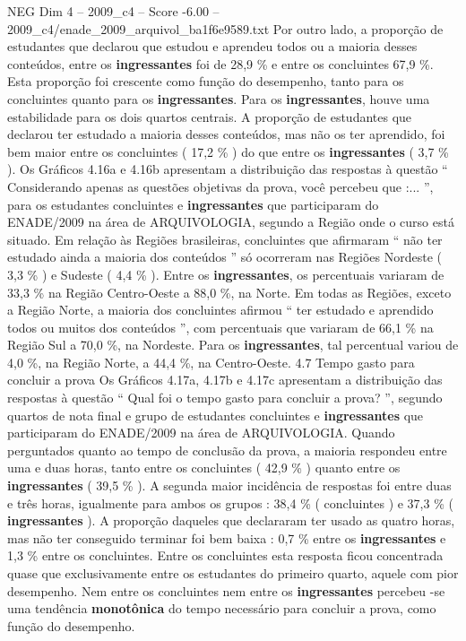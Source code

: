 \begin{textsample}{NEG Dim 4 – 2009\_c4 – Score -6.00 – 2009\_c4/enade\_2009\_arquivol\_ba1f6e9589.txt}
Por outro lado, a proporção de estudantes que declarou que estudou e aprendeu todos ou a maioria desses conteúdos, entre os \textbf{ingressantes} foi de 28,9 \% e entre os concluintes 67,9 \%.
Esta proporção foi crescente como função do desempenho, tanto para os concluintes quanto para os \textbf{ingressantes}.
Para os \textbf{ingressantes}, houve uma estabilidade para os dois quartos centrais.
A proporção de estudantes que declarou ter estudado a maioria desses conteúdos, mas não os ter aprendido, foi bem maior entre os concluintes ( 17,2 \% ) do que entre os \textbf{ingressantes} ( 3,7 \% ).
Os Gráficos 4.16a e 4.16b apresentam a distribuição das respostas à questão “ Considerando apenas as questões objetivas da prova, você percebeu que :... ”, para os estudantes concluintes e \textbf{ingressantes} que participaram do ENADE/2009 na área de ARQUIVOLOGIA, segundo a Região onde o curso está situado.
Em relação às Regiões brasileiras, concluintes que afirmaram “ não ter estudado ainda a maioria dos conteúdos ” só ocorreram nas Regiões Nordeste ( 3,3 \% ) e Sudeste ( 4,4 \% ).
Entre os \textbf{ingressantes}, os percentuais variaram de 33,3 \% na Região Centro-Oeste a 88,0 \%, na Norte.
Em todas as Regiões, exceto a Região Norte, a maioria dos concluintes afirmou “ ter estudado e aprendido todos ou muitos dos conteúdos ”, com percentuais que variaram de 66,1 \% na Região Sul a 70,0 \%, na Nordeste.
Para os \textbf{ingressantes}, tal percentual variou de 4,0 \%, na Região Norte, a 44,4 \%, na Centro-Oeste. 4.7 Tempo gasto para concluir a prova Os Gráficos 4.17a, 4.17b e 4.17c apresentam a distribuição das respostas à questão “ Qual foi o tempo gasto para concluir a prova? ”, segundo quartos de nota final e grupo de estudantes concluintes e \textbf{ingressantes} que participaram do ENADE/2009 na área de ARQUIVOLOGIA.
Quando perguntados quanto ao tempo de conclusão da prova, a maioria respondeu entre uma e duas horas, tanto entre os concluintes ( 42,9 \% ) quanto entre os \textbf{ingressantes} ( 39,5 \% ).
A segunda maior incidência de respostas foi entre duas e três horas, igualmente para ambos os grupos : 38,4 \% ( concluintes ) e 37,3 \% ( \textbf{ingressantes} ).
A proporção daqueles que declararam ter usado as quatro horas, mas não ter conseguido terminar foi bem baixa : 0,7 \% entre os \textbf{ingressantes} e 1,3 \% entre os concluintes.
Entre os concluintes esta resposta ficou concentrada quase que exclusivamente entre os estudantes do primeiro quarto, aquele com pior desempenho.
Nem entre os concluintes nem entre os \textbf{ingressantes} percebeu -se uma tendência \textbf{monotônica} do tempo necessário para concluir a prova, como função do desempenho.

\end{textsample}
